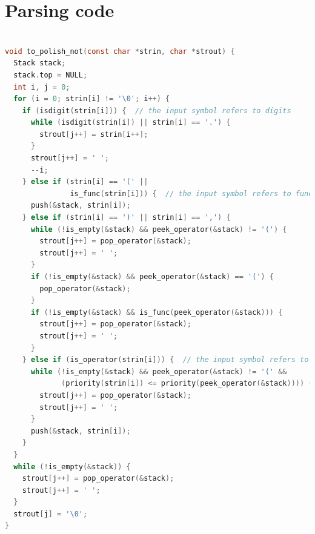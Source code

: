 \documentclass{article}
\begin{document}
\clearpage
\section{Parsing code}

\begin{lstlisting}[language=C]

void to_polish_not(const char *strin, char *strout) {
  Stack stack;
  stack.top = NULL;
  int i, j = 0;
  for (i = 0; strin[i] != '\0'; i++) {
    if (isdigit(strin[i])) {  // the input symbol refers to digits
      while (isdigit(strin[i]) || strin[i] == '.') {
        strout[j++] = strin[i++];
      }
      strout[j++] = ' ';
      --i;
    } else if (strin[i] == '(' ||
               is_func(strin[i])) {  // the input symbol refers to functions
      push(&stack, strin[i]);
    } else if (strin[i] == ')' || strin[i] == ',') {
      while (!is_empty(&stack) && peek_operator(&stack) != '(') {
        strout[j++] = pop_operator(&stack);
        strout[j++] = ' ';
      }
      if (!is_empty(&stack) && peek_operator(&stack) == '(') {
        pop_operator(&stack);
      }
      if (!is_empty(&stack) && is_func(peek_operator(&stack))) {
        strout[j++] = pop_operator(&stack);
        strout[j++] = ' ';
      }
    } else if (is_operator(strin[i])) {  // the input symbol refers to operators
      while (!is_empty(&stack) && peek_operator(&stack) != '(' &&
             (priority(strin[i]) <= priority(peek_operator(&stack)))) {
        strout[j++] = pop_operator(&stack);
        strout[j++] = ' ';
      }
      push(&stack, strin[i]);
    }
  }
  while (!is_empty(&stack)) {
    strout[j++] = pop_operator(&stack);
    strout[j++] = ' ';
  }
  strout[j] = '\0';
}

\end{lstlisting}
\end{document}
